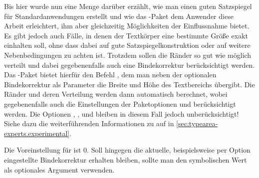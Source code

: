 \begin{Declaration}
\end{Declaration}%
Bis hier wurde nun eine Menge darüber erzählt, wie man einen guten
Satzspiegel für Standardanwendungen erstellt und wie das
-Paket dem Anwender diese Arbeit erleichtert, ihm aber
gleichzeitig Möglichkeiten der Einflussnahme bietet. Es gibt jedoch auch
Fälle, in denen der Textkörper eine bestimmte Größe exakt einhalten soll, ohne
dass dabei auf gute Satzspiegelkonstruktion oder auf weitere Nebenbedingungen
zu achten ist. Trotzdem sollen die Ränder so gut wie möglich verteilt und
dabei gegebenenfalls auch eine Bindekorrektur berücksichtigt werden. Das
-Paket bietet hierfür den Befehl , dem man
neben der optionalen Bindekorrektur als Parameter die Breite und Höhe des
Textbereichs übergibt. Die Ränder und deren Verteilung werden dann automatisch
berechnet, wobei gegebenenfalls auch die Einstellungen der Paketoptionen
 und
 berücksichtigt werden. Die Optionen
,
,
 und
 bleiben in
diesem Fall jedoch unberücksichtigt! Siehe dazu die weiterführenden
Informationen zu  auf
 in
\autoref{sec:typearea-experts.experimental}.

Die Voreinstellung für  ist 0. Soll hingegen die aktuelle,
beispielsweise per Option 
eingestellte Bindekorrektur erhalten bleiben, sollte man den symbolischen Wert
 als optionales Argument verwenden.

